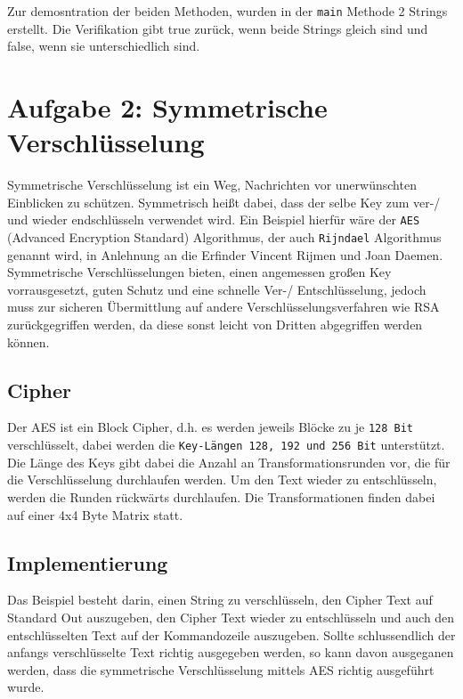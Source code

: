 \documentclass[12pt]{article}
\begin{document}
Zur demosntration der beiden Methoden, wurden in der \texttt{main} Methode 2 Strings erstellt. Die Verifikation gibt true zurück, wenn beide Strings gleich sind und false, wenn sie unterschiedlich sind.


\section{Aufgabe 2: Symmetrische Verschlüsselung}
Symmetrische Verschlüsselung ist ein Weg, Nachrichten vor unerwünschten
Einblicken zu schützen. Symmetrisch heißt dabei, dass der selbe Key zum ver-/
und wieder endschlüsseln verwendet wird. Ein Beispiel hierfür wäre der \texttt{AES}
(Advanced Encryption Standard) Algorithmus, der auch \texttt{Rijndael}
Algorithmus genannt wird, in Anlehnung an die Erfinder Vincent Rijmen und Joan
Daemen. Symmetrische Verschlüsselungen bieten, einen angemessen großen Key
vorrausgesetzt, guten Schutz und eine schnelle Ver-/ Entschlüsselung, 
jedoch muss zur sicheren Übermittlung auf andere
Verschlüsselungsverfahren wie RSA zurückgegriffen werden, da diese sonst leicht
von Dritten abgegriffen werden können.

\subsection{Cipher}
Der AES ist ein Block Cipher, d.h. es werden jeweils Blöcke zu je \texttt{128 Bit}
verschlüsselt, dabei werden die \texttt{Key-Längen 128, 192 und 256 Bit}
unterstützt. Die Länge des Keys gibt dabei die Anzahl an Transformationsrunden
vor, die für die Verschlüsselung durchlaufen werden. Um den Text wieder zu
entschlüsseln, werden die Runden rückwärts durchlaufen. Die Transformationen
finden dabei auf einer 4x4 Byte Matrix statt.

\subsection{Implementierung}
Das Beispiel besteht darin, einen String zu verschlüsseln, den Cipher Text auf
Standard Out auszugeben, den Cipher Text wieder zu entschlüsseln und auch den
entschlüsselten Text auf der Kommandozeile auszugeben. Sollte schlussendlich der
anfangs verschlüsselte Text richtig ausgegeben werden, so kann davon ausgeganen werden,
dass die symmetrische Verschlüsselung mittels AES richtig ausgeführt wurde.
\end{document}
